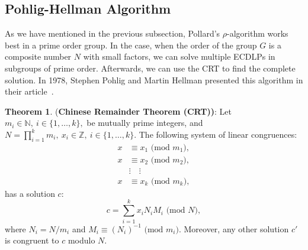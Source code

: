 \documentclass[thesis=M,english]{FITthesis}[2012/10/20]
\theoremstyle{remark}
\theoremstyle{definition}
\newtheorem{theorem}{Theorem}[section]
\begin{document}
\subsection{Pohlig-Hellman Algorithm}\label{pohlig}
As we have mentioned in the previous subsection, Pollard's $\rho$-algorithm works best in a prime order group. In the case, when the order of the group $G$ is a composite number $N$ with small factors, we can solve multiple ECDLPs in subgroups of prime order. Afterwards, we can use the CRT to find the complete solution. In 1978, Stephen Pohlig and Martin Hellman presented this algorithm in their article~\cite{PH}. 
\begin{theorem}(\textbf{Chinese Remainder Theorem (CRT))}: Let $m_i \in \mathbb{N},\ i \in \{1,\ldots, k\},$ be mutually prime integers, and $N=\prod_{i=1}^k m_i,\ x_i \in \mathbb{Z},\ i \in \{1,\ldots, k\}.$ 
The following system of linear congruences:
\begin{align*}
x &\equiv x_1 \text{ (mod $m_1$)}, \\
x &\equiv x_2 \text{ (mod $m_2$)}, \\
&\vdots \quad \vdots \\
x &\equiv x_k \text{ (mod $m_k$)},
\end{align*}
has a solution $c$:
$$
c = \sum_{i=1}^k x_iN_iM_i \text{ (mod $N$)},
$$ where $N_i=N/m_i$ and $M_i\equiv(N_i)^{-1} \text{ (mod $m_i$)}$. Moreover, any other solution $c'$ is congruent to $c$ modulo $N$.
\end{theorem} 
\end{document}
